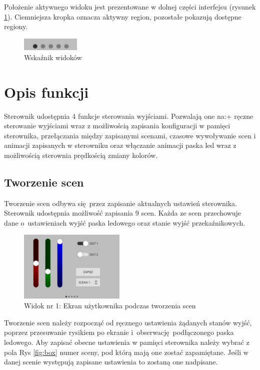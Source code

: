 \documentclass[12pt, eng, twoside, openany, final]{mgr}
\begin{document}
\noindent    Położenie aktywnego widoku jest prezentowane w dolnej części interfejsu (rysunek \ref{fig:ind}). Ciemniejsza kropka oznacza aktywny region, pozostałe pokazują dostępne regiony.
        \begin{figure}[H]
        \begin{center}
            \includegraphics[width=0.25\textwidth]{ui_pageind.jpg}
            \caption{Wskaźnik widoków}
            \label{fig:ind}
        \end{center}
        \end{figure}
    \newpage
    
    \section{Opis funkcji}
        Sterownik udostępnia 4 funkcje sterowania wyjściami. Pozwalają one na:+ ręczne sterowanie wyjściami wraz z możliwością zapisania konfiguracji w pamięci sterownika, przełączania między zapisanymi scenami, czasowe wywoływanie scen i animacji zapisanych w sterowniku oraz włączanie animacji paska led wraz z możliwością sterownia prędkością zmiany kolorów.
        \subsection{Tworzenie scen}
        Tworzenie scen odbywa się przez zapisanie aktualnych ustawień sterownika. Sterownik udostępnia możliwość zapisania  9 scen. Każda ze scen przechowuje dane o~ustawieniach wyjść paska ledowego oraz stanie wyjść przekaźnikowych. 

            \begin{figure}[H]
            \begin{center}
                \includegraphics[width=0.45\textwidth]{ui_manualTab.jpg}
                \caption{Widok nr 1: Ekran użytkownika podczas tworzenia scen}
                \label{fig:view1}
            \end{center}
            \end{figure}
            \noindent Tworzenie scen należy rozpocząć od ręcznego ustawienia żądanych stanów wyjść, poprzez przesuwanie rysikiem po ekranie i~obserwację podłączonego paska ledowego. Aby zapisać obecne ustawienia w pamięci sterownika należy wybrać z pola Rys \ref{fig:box} numer sceny, pod którą mają one zostać zapamiętane. Jeśli w danej scenie występują zapisane ustawienia to zostaną one nadpisane.
            
\end{document}
